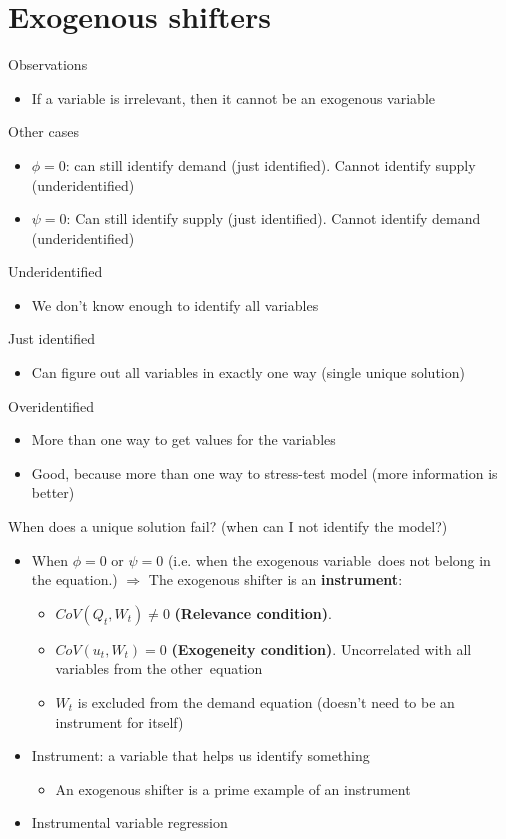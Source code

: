 \documentclass[10pt, oneside]{article}
\begin{document}
\section{Exogenous shifters}
Observations
\begin{itemize}
    \item If a variable is irrelevant, then it cannot be an exogenous variable
\end{itemize}
Other cases
\begin{itemize}
    \item $\phi=0$: can still identify demand (just identified). Cannot identify supply (underidentified)
    \item $\psi = 0$: Can still identify supply (just identified). Cannot identify demand (underidentified)
\end{itemize}
Underidentified
\begin{itemize}
    \item We don't know enough to identify all variables
\end{itemize}
Just identified
\begin{itemize}
    \item Can figure out all variables in exactly one way (single unique solution)
\end{itemize}
Overidentified
\begin{itemize}
    \item More than one way to get values for the variables
    \item Good, because more than one way to stress-test model (more information is better)
\end{itemize}
When does a unique solution fail? (when can I not identify the model?)
\begin{itemize}
    \item When $\phi = 0$ or $\psi = 0$ (i.e. when the exogenous variable does not belong in the equation.) $\Rightarrow$ The exogenous shifter is an \textbf{instrument}:
    \begin{itemize}
        \item $CoV(Q_t,W_t) \neq 0$ \textbf{(Relevance condition)}. 
        \item $CoV(u_t, W_t ) = 0$ \textbf{(Exogeneity condition)}. Uncorrelated with all variables from the other equation
        \item $W_t$ is excluded from the demand equation (doesn't need to be an instrument for itself)
    \end{itemize}
    \item Instrument: a variable that helps us identify something
    \begin{itemize}
        \item An exogenous shifter is a prime example of an instrument
    \end{itemize}
    \item Instrumental variable regression
\end{itemize}
\end{document}
